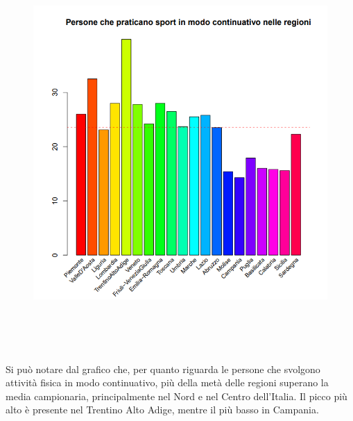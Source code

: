 \begin{figure}[!htbp]
    \centering
    \includegraphics[height=15cm]{ProgettoSAD/capitoli/images/barre_modocont.png}
    \label{fig:barre_modocont}
\end{figure}

Si può notare dal grafico che, per quanto riguarda le persone che svolgono attività fisica in modo continuativo, più della metà delle regioni superano la media campionaria, principalmente nel Nord e nel Centro dell'Italia. Il picco più alto è presente nel Trentino Alto Adige, mentre il più basso in Campania.

